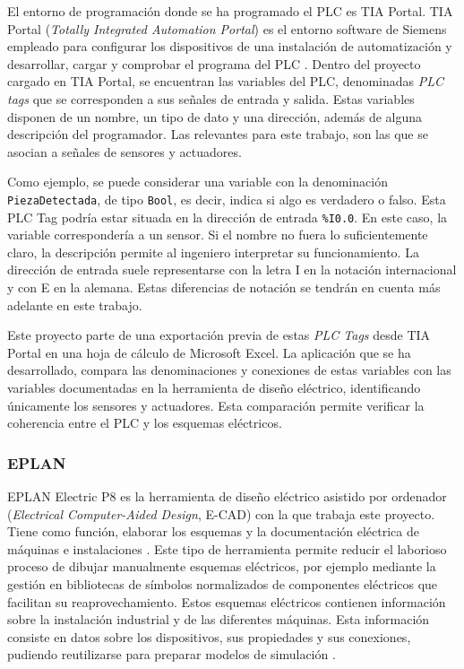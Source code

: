 El entorno de programación donde se ha programado el PLC es TIA Portal. TIA Portal (\textit{Totally Integrated Automation Portal}) es el entorno software de Siemens empleado para configurar los dispositivos de una instalación de automatización y desarrollar, cargar y comprobar el programa del PLC . Dentro del proyecto cargado en TIA Portal, se encuentran las variables del PLC, denominadas \textit{PLC tags} que se corresponden a sus señales de entrada y salida. Estas variables disponen de un nombre, un tipo de dato y una dirección, además de alguna descripción del programador. Las relevantes para este trabajo, son las que se asocian a señales de sensores y actuadores.

Como ejemplo, se puede considerar una variable con la denominación \texttt{PiezaDetectada}, de tipo \texttt{Bool}, es decir, indica si algo es verdadero o falso. Esta PLC Tag podría estar situada en la dirección de entrada \texttt{\%I0.0}. En este caso, la variable correspondería a un sensor. Si el nombre no fuera lo suficientemente claro, la descripción permite al ingeniero interpretar su funcionamiento. La dirección de entrada suele representarse con la letra I en la notación internacional y con E en la alemana. Estas diferencias de notación se tendrán en cuenta más adelante en este trabajo.

Este proyecto parte de una exportación previa de estas \textit{PLC Tags} desde TIA Portal en una hoja de cálculo de Microsoft Excel. La aplicación que se ha desarrollado, compara las denominaciones y conexiones de estas variables con las variables documentadas en la herramienta de diseño eléctrico, identificando únicamente los sensores y actuadores. Esta comparación permite verificar la coherencia entre el PLC y los esquemas eléctricos. 

\subsubsection{EPLAN} \label{subsec:eplan}

EPLAN Electric P8 es la herramienta de diseño eléctrico asistido por ordenador (\textit{Electrical Computer-Aided Design}, E-CAD) con la que trabaja este proyecto. Tiene como función, elaborar los esquemas y la documentación eléctrica de máquinas e instalaciones . Este tipo de herramienta permite reducir el laborioso proceso de dibujar manualmente esquemas eléctricos, por ejemplo mediante la gestión en bibliotecas de símbolos normalizados de componentes eléctricos que facilitan su reaprovechamiento. Estos esquemas eléctricos contienen información sobre la instalación industrial y de las diferentes máquinas. Esta información consiste en datos sobre los dispositivos, sus propiedades y sus conexiones, pudiendo reutilizarse para preparar modelos de simulación . 

